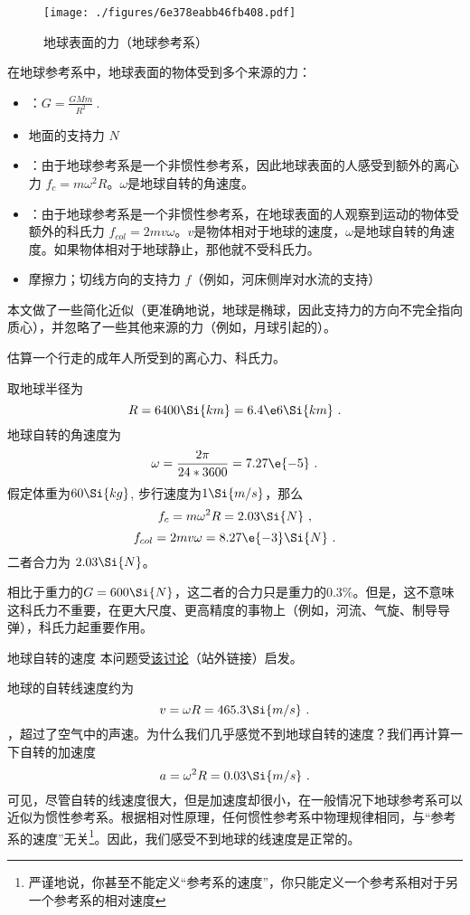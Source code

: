 
\begin{issues}
\issueDraft
{} 
\end{issues}

\begin{figure}[ht]
\centering
\texttt{[image: ./figures/6e378eabb46fb408.pdf]}
\caption{地球表面的力（地球参考系）} \label{fig_FOE_1}
\end{figure}

在地球参考系中，地球表面的物体受到多个来源的力：
\begin{itemize}
\item {}：$G=\frac{GMm}{R^2}~.$
\item 地面的支持力 $N$
\item {}：由于地球参考系是一个非惯性参考系，因此地球表面的人感受到额外的离心力 $f_c = m \omega^2 R$。$\omega$是地球自转的角速度。
\item {}：由于地球参考系是一个非惯性参考系，在地球表面的人观察到运动的物体受额外的科氏力 $f_{col} = 2 m v \omega$。$v$是物体相对于地球的速度，$\omega$是地球自转的角速度。如果物体相对于地球静止，那他就不受科氏力。
\item 摩擦力；切线方向的支持力 $f$（例如，河床侧岸对水流的支持）
\end{itemize}

本文做了一些简化近似（更准确地说，地球是椭球，因此支持力的方向不完全指向质心），并忽略了一些其他来源的力（例如，月球引起的）。

\begin{example}{}
估算一个行走的成年人所受到的离心力、科氏力。

取地球半径为
$$R=6400\Si{km}=6.4\e6 \Si{km}~.$$
地球自转的角速度为
$$\omega = \frac{2\pi}{24*3600}=7.27\e{-5}~.$$
假定体重为$60 \Si{kg}$, 步行速度为$1 \Si{m/s}$，那么
$$
f_c = m \omega^2 R = 2.03 \Si{N}~,
$$
$$
f_{col} = 2 m v\omega = 8.27\e{-3} \Si{N}~.
$$
二者合力为 $2.03 \Si{N}$。

相比于重力的$G=600 \Si{N}$，这二者的合力只是重力的$0.3\%$。但是，这不意味这科氏力不重要，在更大尺度、更高精度的事物上（例如，河流、气旋、制导导弹），科氏力起重要作用。
\end{example}

\begin{example}{地球自转的速度}
本问题受\href{https://www.zhihu.com/question/579214803}{该讨论}（站外链接）启发。

地球的自转线速度约为 $$v=\omega R = 465.3 \Si{m/s}~.$$，超过了空气中的声速。为什么我们几乎感觉不到地球自转的速度？我们再计算一下自转的加速度
$$a=\omega^2 R= 0.03 \Si{m/s}~.$$
可见，尽管自转的线速度很大，但是加速度却很小，在一般情况下地球参考系可以近似为惯性参考系。根据相对性原理，任何惯性参考系中物理规律相同，与“参考系的速度”无关\footnote{严谨地说，你甚至不能定义“参考系的速度”，你只能定义一个参考系相对于另一个参考系的相对速度}。因此，我们感受不到地球的线速度是正常的。
\end{example}
